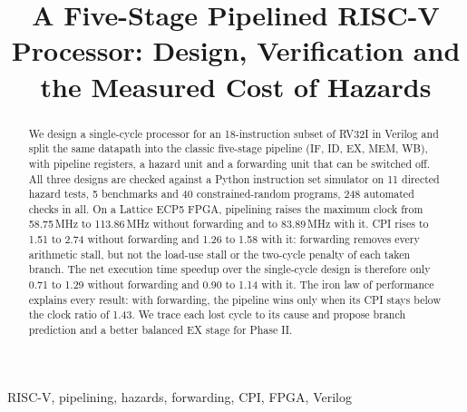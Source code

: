 \documentclass[conference]{IEEEtran}
\begin{document}
\title{A Five-Stage Pipelined RISC-V Processor: Design, Verification and the Measured Cost of Hazards}

\author{
}

\maketitle

\begin{abstract}
We design a single-cycle processor for an 18-instruction subset of RV32I in
Verilog and split the same datapath into the classic five-stage pipeline
(IF, ID, EX, MEM, WB), with pipeline registers, a hazard unit and a
forwarding unit that can be switched off. All three designs are checked
against a Python instruction set simulator on 11 directed hazard tests, 5
benchmarks and 40 constrained-random programs, 248 automated checks in all.
On a Lattice ECP5 FPGA, pipelining raises the maximum clock from 58.75\,MHz
to 113.86\,MHz without forwarding and to 83.89\,MHz with it. CPI rises to
1.51 to 2.74 without forwarding and 1.26 to 1.58 with it: forwarding removes
every arithmetic stall, but not the load-use stall or the two-cycle penalty
of each taken branch. The net execution time speedup over the single-cycle
design is therefore only 0.71 to 1.29 without forwarding and 0.90 to 1.14
with it. The iron law of performance explains every result: with forwarding,
the pipeline wins only when its CPI stays below the clock ratio of 1.43. We
trace each lost cycle to its cause and propose branch prediction and a better
balanced EX stage for Phase II.
\end{abstract}

\begin{IEEEkeywords}
RISC-V, pipelining, hazards, forwarding, CPI, FPGA, Verilog
\end{IEEEkeywords}












\end{document}
